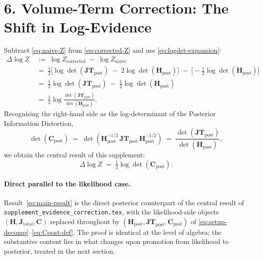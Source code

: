 \documentclass[11pt]{article}
\begin{document}
\section*{6. Volume-Term Correction: The Shift in Log-Evidence}

Subtract \eqref{eq:naive-Z} from \eqref{eq:corrected-Z} and use
\eqref{eq:logdet-expansion}:
\begin{align}
\Delta\log Z
\;&:=\;
\log Z_{\mathrm{corrected}} \;-\; \log Z_{\mathrm{naive}}
\nonumber\\[4pt]
&=\;
\tfrac{1}{2}\bigl[
\log\det(\mathbf{JT}_{\mathrm{post}})
\;-\;
2\log\det(\mathbf H_{\mathrm{post}})
\bigr]
\;-\;
\bigl[
-\tfrac{1}{2}\log\det(\mathbf H_{\mathrm{post}})
\bigr]
\nonumber\\[4pt]
&=\;
\tfrac{1}{2}\log\det(\mathbf{JT}_{\mathrm{post}})
\;-\;
\tfrac{1}{2}\log\det(\mathbf H_{\mathrm{post}})
\nonumber\\[4pt]
&=\;
\tfrac{1}{2}\log
\frac{\det(\mathbf{JT}_{\mathrm{post}})}
     {\det(\mathbf H_{\mathrm{post}})}.
\label{eq:DeltaZ-ratio}
\end{align}
Recognising the right-hand side as the log-determinant of the Posterior Information
Distortion,
\begin{equation}
\det(\mathbf C_{\mathrm{post}})
\;=\;
\det\!\left(
\mathbf H_{\mathrm{post}}^{-1/2}\,
\mathbf{JT}_{\mathrm{post}}\,
\mathbf H_{\mathrm{post}}^{-1/2}
\right)
\;=\;
\frac{\det(\mathbf{JT}_{\mathrm{post}})}
     {\det(\mathbf H_{\mathrm{post}})},
\label{eq:detCpost-identity}
\end{equation}
we obtain the central result of this supplement:
\begin{equation}
\boxed{\;
\Delta\log Z
\;=\;
\tfrac{1}{2}\log\det(\mathbf C_{\mathrm{post}}).
\;}
\label{eq:main-result}
\end{equation}

\paragraph{Direct parallel to the likelihood case.}
Result~\eqref{eq:main-result} is the direct posterior counterpart of the central result
of \texttt{supplement\_evidence\_correction.tex}, with the likelihood-side objects
$(\mathbf H, \mathbf J_{\mathrm{total}}, \mathbf C)$ replaced throughout by
$(\mathbf H_{\mathrm{post}}, \mathbf{JT}_{\mathrm{post}}, \mathbf C_{\mathrm{post}})$
of \eqref{eq:setup-decomp}--\eqref{eq:Cpost-def}. The proof is identical at the level of
algebra; the substantive content lies in what changes upon promotion from likelihood to
posterior, treated in the next section.
\end{document}
